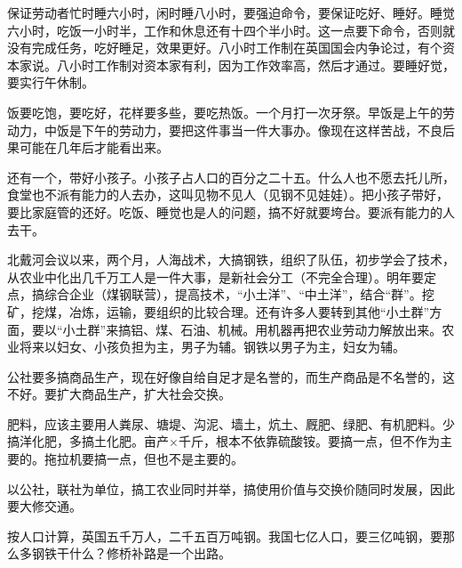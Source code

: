 保证劳动者忙时睡六小时，闲时睡八小时，要强迫命令，要保证吃好、睡好。睡觉六小时，吃饭一小时半，工作和休息还有十四个半小时。这一点要下命令，否则就没有完成任务，吃好睡足，效果更好。八小时工作制在英国国会内争论过，有个资本家说。八小时工作制对资本家有利，因为工作效率高，然后才通过。要睡好觉，要实行午休制。

饭要吃饱，要吃好，花样要多些，要吃热饭。一个月打一次牙祭。早饭是上午的劳动力，中饭是下午的劳动力，要把这件事当一件大事办。像现在这样苦战，不良后果可能在几年后才能看出来。

还有一个，带好小孩子。小孩子占人口的百分之二十五。什么人也不愿去托儿所，食堂也不派有能力的人去办，这叫见物不见人（见钢不见娃娃）。把小孩子带好，要比家庭管的还好。吃饭、睡觉也是人的问题，搞不好就要垮台。要派有能力的人去干。

北戴河会议以来，两个月，人海战术，大搞钢铁，组织了队伍，初步学会了技术，从农业中化出几千万工人是一件大事，是新社会分工（不完全合理）。明年要定点，搞综合企业（煤钢联营），提高技术，“小土洋”、“中土洋”，结合“群”。挖矿，挖煤，冶炼，运输，要组织的比较合理。还有许多人要转到其他“小土群”方面，要以“小土群”来搞铝、煤、石油、机械。用机器再把农业劳动力解放出来。农业将来以妇女、小孩负担为主，男子为辅。钢铁以男子为主，妇女为辅。

公社要多搞商品生产，现在好像自给自足才是名誉的，而生产商品是不名誉的，这不好。要扩大商品生产，扩大社会交换。

肥料，应该主要用人粪尿、塘堤、沟泥、墙土，炕土、厩肥、绿肥、有机肥料。少搞洋化肥，多搞土化肥。亩产×千斤，根本不依靠硫酸铵。要搞一点，但不作为主要的。拖拉机要搞一点，但也不是主要的。

以公社，联社为单位，搞工农业同时并举，搞使用价值与交换价随同时发展，因此要大修交通。

按人口计算，英国五千万人，二千五百万吨钢。我国七亿人口，要三亿吨钢，要那么多钢铁干什么？修桥补路是一个出路。


